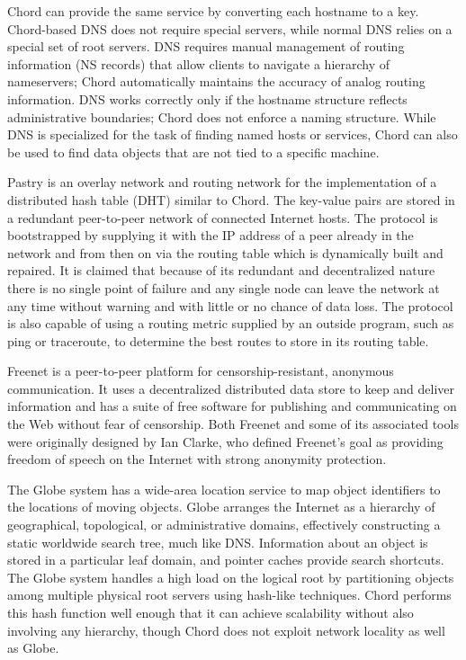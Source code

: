 \documentclass[twocolumn]{article}
\begin{document}
Chord can provide the same service by converting each hostname to a key. Chord-based\cite{chord} DNS does not require special servers, while normal DNS relies on a special set of root servers. DNS requires manual management of routing information (NS records) that allow clients to navigate a hierarchy of nameservers; Chord automatically maintains the accuracy of analog routing information. DNS works correctly only if the hostname structure reflects administrative boundaries; Chord does not enforce a naming structure. While DNS is specialized for the task of finding named hosts or services, Chord can also be used to find data objects that are not tied to a specific machine.

Pastry is an overlay network and routing network for the implementation of a distributed hash table (DHT) similar to Chord. The key-value pairs are stored in a redundant peer-to-peer network of connected Internet hosts. The protocol is bootstrapped by supplying it with the IP address of a peer already in the network and from then on via the routing table which is dynamically built and repaired. It is claimed that because of its redundant and decentralized nature there is no single point of failure and any single node can leave the network at any time without warning and with little or no chance of data loss. The protocol is also capable of using a routing metric supplied by an outside program, such as ping or traceroute, to determine the best routes to store in its routing table.

Freenet is a peer-to-peer platform for censorship-resistant, anonymous communication. It uses a decentralized distributed data store to keep and deliver information and has a suite of free software for publishing and communicating on the Web without fear of censorship. Both Freenet and some of its associated tools were originally designed by Ian Clarke, who defined Freenet's goal as providing freedom of speech on the Internet with strong anonymity protection.

The Globe system has a wide-area location service to map object identifiers to the locations of moving objects. Globe arranges the Internet as a hierarchy of geographical, topological, or administrative domains, effectively constructing a static worldwide search tree, much like DNS. Information about an object is stored in a particular leaf domain, and pointer caches provide search shortcuts. The Globe system handles a high load on the logical root by partitioning objects among multiple physical root servers using hash-like techniques. Chord performs this hash function well enough that it can achieve scalability without also involving any hierarchy, though Chord does not exploit network locality as well as Globe.
\end{document}
